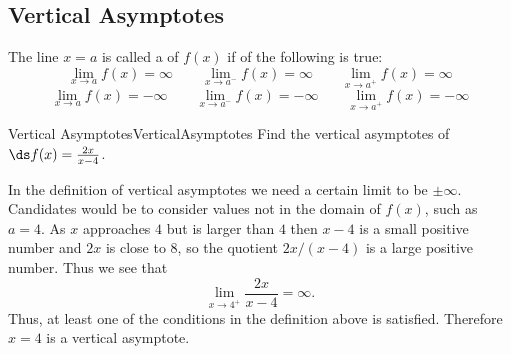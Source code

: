 \subsection{Vertical Asymptotes}\label{subsec:VerticalAsymptotes}
The line $x=a$ is called a  of $f(x)$ if  of the following is true:
$$\lim_{x\to a}f(x)=\infty\qquad\lim_{x\to a^-}f(x)=\infty\qquad\lim_{x\to a^+}f(x)=\infty$$
$$\lim_{x\to a}f(x)=-\infty\qquad\lim_{x\to a^-}f(x)=-\infty\qquad\lim_{x\to a^+}f(x)=-\infty$$ 

\begin{example}{Vertical Asymptotes}{VerticalAsymptotes}
Find the vertical asymptotes of
$\ds f(x)=\frac{2x}{x-4}$.
\end{example}

\begin{solution} 
In the definition of vertical asymptotes we need a certain limit to be $\pm\infty$.
Candidates would be to consider values not in the domain of $f(x)$, such as $a=4$.
As $x$ approaches $4$ but is larger than $4$ then $x-4$ is a small positive number and $2x$ is close to $8$, so the quotient $2x/(x-4)$ is a large positive number.
Thus we see that
$$\lim_{x\to 4^+}\frac{2x}{x-4}=\infty.$$
Thus, at least one of the conditions in the definition above is satisfied. Therefore $x=4$ is a vertical asymptote.
\end{solution}
